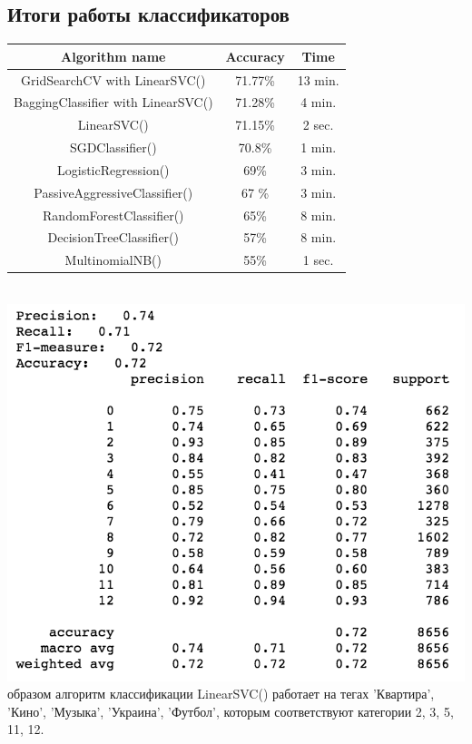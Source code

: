 \documentclass{article}
\newcommand\tab[1][1cm]{\hspace*{#1}}
\begin{document}
\subsection{Итоги работы классификаторов}
\begin{center}
\begin{tabular}{||c | c | c||} 
\hline
 Algorithm name & Accuracy & Time \\ [0.5ex] 
 \hline\hline
   GridSearchCV with LinearSVC() & 71.77\% & 13 min. \\  
 \hline
  BaggingClassifier with LinearSVC() & 71.28\% & 4 min. \\  
 \hline
 LinearSVC() & 71.15\% & 2 sec. \\  
 \hline
 SGDClassifier() & 70.8\% & 1 min.\\ 
  \hline
 LogisticRegression() & 69\% & 3 min. \\   
 \hline
 PassiveAggressiveClassifier() &67 \% &  3 min.\\
 \hline
 RandomForestClassifier() & 65\% & 8 min.\\ 
 \hline
 DecisionTreeClassifier() & 57\% & 8 min.\\
 \hline
 MultinomialNB() & 55\% & 1 sec.\\  [1ex] 
 \hline
\end{tabular}
\end{center}\\
\includegraphics[scale=0.8]{f13.png}\\
 образом алгоритм классификации LinearSVC() работает на тегах 'Квартира', 'Кино', 'Музыка', 'Украина', 'Футбол', которым соответствуют категории 2, 3, 5, 11, 12.\\
\end{document}

